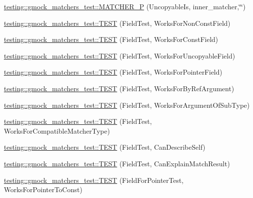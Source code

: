 \begin{DoxyCompactItemize}
\hyperlink{namespacetesting_1_1gmock__matchers__test_afcdfddd9d56b20c0692a360115189836}{testing\+::gmock\+\_\+matchers\+\_\+test\+::\+M\+A\+T\+C\+H\+E\+R\+\_\+P} (Uncopyable\+Is, inner\+\_\+matcher,\char`\"{}\char`\"{})
\item 
\hyperlink{namespacetesting_1_1gmock__matchers__test_a57213a63527bbd66c024dd1cfafe92d1}{testing\+::gmock\+\_\+matchers\+\_\+test\+::\+T\+E\+ST} (Field\+Test, Works\+For\+Non\+Const\+Field)
\item 
\hyperlink{namespacetesting_1_1gmock__matchers__test_a065efc397a420d3dde87909b4a9a6285}{testing\+::gmock\+\_\+matchers\+\_\+test\+::\+T\+E\+ST} (Field\+Test, Works\+For\+Const\+Field)
\item 
\hyperlink{namespacetesting_1_1gmock__matchers__test_ac26d681f09865b0727ca32343d974907}{testing\+::gmock\+\_\+matchers\+\_\+test\+::\+T\+E\+ST} (Field\+Test, Works\+For\+Uncopyable\+Field)
\item 
\hyperlink{namespacetesting_1_1gmock__matchers__test_a56b1c75b98aaa5c9d3a6dec2d3ba30dc}{testing\+::gmock\+\_\+matchers\+\_\+test\+::\+T\+E\+ST} (Field\+Test, Works\+For\+Pointer\+Field)
\item 
\hyperlink{namespacetesting_1_1gmock__matchers__test_afcb890c159493e250477408a453b08d1}{testing\+::gmock\+\_\+matchers\+\_\+test\+::\+T\+E\+ST} (Field\+Test, Works\+For\+By\+Ref\+Argument)
\item 
\hyperlink{namespacetesting_1_1gmock__matchers__test_ae720452c3587433e26bea2ea7e91f8e6}{testing\+::gmock\+\_\+matchers\+\_\+test\+::\+T\+E\+ST} (Field\+Test, Works\+For\+Argument\+Of\+Sub\+Type)
\item 
\hyperlink{namespacetesting_1_1gmock__matchers__test_a27058ed7297742f08419bc5feb3ef687}{testing\+::gmock\+\_\+matchers\+\_\+test\+::\+T\+E\+ST} (Field\+Test, Works\+For\+Compatible\+Matcher\+Type)
\item 
\hyperlink{namespacetesting_1_1gmock__matchers__test_ac43583cb3c4221aa6bd0132c2cb3fed6}{testing\+::gmock\+\_\+matchers\+\_\+test\+::\+T\+E\+ST} (Field\+Test, Can\+Describe\+Self)
\item 
\hyperlink{namespacetesting_1_1gmock__matchers__test_ae1279ce8e2a3a6c6f0d4dbe436c9da02}{testing\+::gmock\+\_\+matchers\+\_\+test\+::\+T\+E\+ST} (Field\+Test, Can\+Explain\+Match\+Result)
\item 
\hyperlink{namespacetesting_1_1gmock__matchers__test_af5c12cdd12f8778074ad0714b83858ed}{testing\+::gmock\+\_\+matchers\+\_\+test\+::\+T\+E\+ST} (Field\+For\+Pointer\+Test, Works\+For\+Pointer\+To\+Const)
\item 

\end{DoxyCompactItemize}

